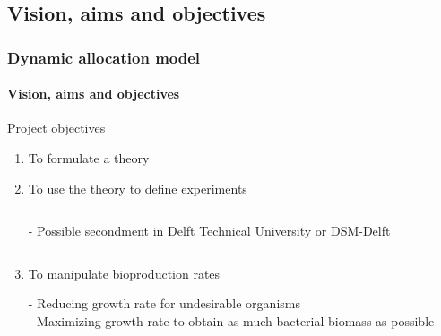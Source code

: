 \documentclass[handout]{beamer}
\begin{document}
\subsection{Vision, aims and objectives}
\begin{frame}
\frametitle{Dynamic allocation model}
\framesubtitle{Vision, aims and objectives}

\begin{block}{Project objectives}
\begin{enumerate}
\item To formulate a theory\\
\item To use the theory to define experiments

\begin{minipage}[0.2\textheight]{\textwidth}
\begin{columns}[c]
\begin{column}{0.5\textwidth}
 - Possible secondment in Delft Technical University or DSM-Delft
\end{column}
\begin{column}{0.5\textwidth}
\end{column}
\end{columns}
\end{minipage}

\item To manipulate bioproduction rates

 - Reducing growth rate for undesirable organisms\\
 - Maximizing growth rate to obtain as much bacterial biomass as possible

\end{enumerate}

\end{block}
\end{frame}
\end{document}
